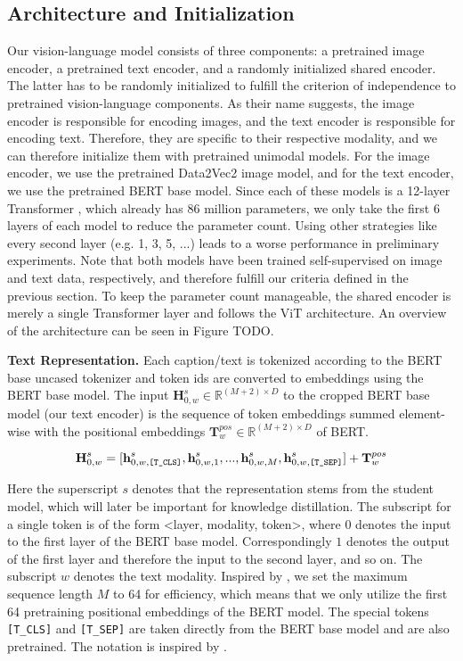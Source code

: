 \documentclass[10pt]{article} %
\begin{document}
\subsection{Architecture and Initialization}
Our vision-language model consists of three components: a pretrained image encoder, a pretrained text encoder, and a randomly initialized
shared encoder.
The latter has to be randomly initialized to fulfill the criterion of independence to pretrained vision-language components.
As their name suggests, the image encoder is responsible for encoding images, and the text encoder is responsible for encoding text.
Therefore, they are specific to their respective modality, and we can therefore initialize them with pretrained unimodal models.
For the image encoder, we use the pretrained Data2Vec2 \citep{data2vec2} image model, and for the text encoder, we use the pretrained
BERT base \citep{bert} model. Since each of these models is a 12-layer Transformer \citep{transformer}, which already has 86 million
parameters, we only take the first 6 layers of each model to reduce the parameter count. Using other strategies like every second layer
(e.g. 1, 3, 5, ...) leads to a worse performance in preliminary experiments. Note that both models have been trained self-supervised on
image and text data, respectively, and therefore fulfill our criteria defined in the previous section. To keep the parameter count manageable,
the shared encoder is merely a single Transformer layer and follows the ViT \citep{vit} architecture. An overview of the architecture can
be seen in Figure TODO.

\textbf{Text Representation.} Each caption/text is tokenized according to the BERT base uncased tokenizer \citep{bert} and token ids are converted
to embeddings using the BERT base model. The input $\textbf{H}^{s}_{0, w} \in \mathbb{R}^{(M+2)\times D}$ to the
cropped BERT base model (our text encoder) is the sequence
of token embeddings summed element-wise with the positional embeddings $\textbf{T}^{pos}_{w} \in \mathbb{R}^{(M+2)\times D}$ of BERT.

\[
\textbf{H}^{s}_{0, w} = [\textbf{h}^{s}_{0, w, \text{\texttt{[T\_CLS]}}}, \textbf{h}^{s}_{0, w, 1}, ..., \textbf{h}^{s}_{0, w, M}, \textbf{h}^{s}_{0, w, \text{\texttt{[T\_SEP]}}}] + \textbf{T}^{pos}_{w}
\]

Here the superscript $s$ denotes that the representation stems from the student model, which will later be important for knowledge distillation.
The subscript for a single token is of the form <layer, modality, token>, where $0$ denotes the input to the first layer of the BERT base model.
Correspondingly $1$ denotes the output of the first layer and
therefore the input to the second layer, and so on. The subscript $w$ denotes the text modality.
Inspired by \citet{beit3}, we set the maximum sequence length $M$ to 64 for efficiency, which means that we
only utilize the first 64 pretraining positional embeddings of the BERT model. The special tokens \texttt{[T\_CLS]} and \texttt{[T\_SEP]}
are taken directly from the BERT base model and are also pretrained. 
The notation is inspired by \citet{vlmo}.
\end{document}
